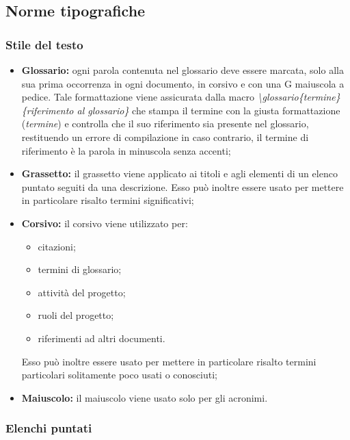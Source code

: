 \documentclass[../NormediProgetto.tex]{subfiles}
\begin{document}

\subsection{Norme tipografiche}

\subsubsection{Stile del testo}

\begin{itemize}
	
	\item \textbf{Glossario:} ogni parola contenuta nel glossario deve essere marcata, solo alla sua prima occorrenza in ogni documento, in corsivo e con una G maiuscola a pedice. Tale formattazione viene assicurata dalla macro \textit{\textbackslash glossario\{termine\}\{riferimento al glossario\}} che stampa il termine con la giusta formattazione (\textit{termine}) e controlla che il suo riferimento sia presente nel glossario, restituendo un errore di compilazione in caso contrario, il termine di riferimento è la parola in minuscola senza accenti;  
	
	\item \textbf{Grassetto:} il grassetto viene applicato ai titoli e agli elementi di un elenco puntato seguiti da una descrizione. Esso può inoltre essere usato per mettere in particolare risalto termini significativi; 
	
	\item \textbf{Corsivo:} il corsivo viene utilizzato per:
	\begin{itemize}
		\item citazioni;
		\item termini di glossario;
		\item attività del progetto;
		\item ruoli del progetto;
		\item riferimenti ad altri documenti.
	\end{itemize}
	
	Esso può inoltre essere usato per mettere in particolare risalto termini particolari solitamente poco usati o conosciuti;
	
	\item{\textbf{Maiuscolo:}} il maiuscolo viene usato solo per gli acronimi.
	
\end{itemize}

\subsubsection{Elenchi puntati}
\end{document}
